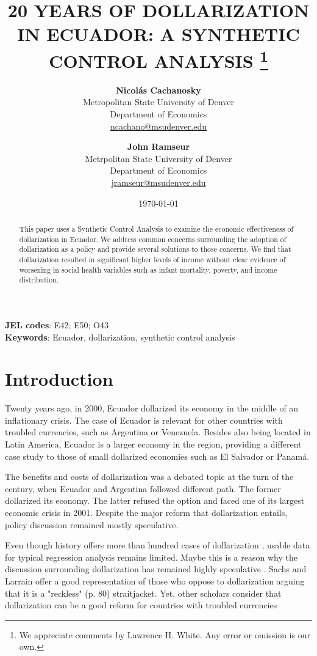 \documentclass[12pt]{article}
\title{20 YEARS OF DOLLARIZATION IN ECUADOR: A SYNTHETIC CONTROL ANALYSIS
       \thanks{We appreciate comments by Lawrence H. White. Any error or omission is our own.} \\
       \bigskip}
\author{
        \textbf{Nicolás Cachanosky} \\
        Metropolitan State University of Denver \\
        Department of Economics \\
        \href{mailto:ncachano@msudenver.edu}{ncachano@msudenver.edu} \\
        \and
        \textbf{John Ramseur} \\
        Metrpolitan State University of Denver \\
        Department of Economics \\
        \href{mailto:jramseur@msudenver.edu}{jramseur@msudenver.edu} \\
        \bigskip}
\date{\today}
\begin{document}

\maketitle

\begin{abstract}
\noindent
This paper uses a Synthetic Control Analysis to examine the economic effectiveness of dollarization in Ecuador. We address common concerns surrounding the adoption of dollarization as a policy and provide several solutions to those concerns. We find that dollarization resulted in significant higher levels of income without clear evidence of worsening in social health variables such as infant mortality, poverty, and income distribution.
\end{abstract}

\bigskip \bigskip
\footnotesize \noindent \textbf{JEL codes}: E42; E50; O43 \\
\footnotesize \noindent \textbf{Keywords}: Ecuador, dollarization, synthetic control analysis

\newpage
\doublespacing


\section{Introduction} 
    \label{sec:intro}

Twenty years ago, in 2000, Ecuador dollarized its economy in the middle of an inflationary crisis. The case of Ecuador is relevant for other countries with troubled currencies, such as Argentina or Venezuela. Besides also being located in Latin America, Ecuador is a larger economy in the region, providing a different case study to those of small dollarized economies such as El Salvador or Panamá. 

The benefits and costs of dollarization was a debated topic at the turn of the century, when Ecuador and Argentina followed different path. The former dollarized its economy. The latter refused the option and faced one of its largest economic crisis in 2001. Despite the major reform that dollarization entails, policy discussion remained mostly speculative. 

Even though history offers more than hundred cases of dollarization \parencite{Schuler2005}, usable data for typical regression analysis remains limited. Maybe this is a reason why the discussion surrounding dollarization has remained highly speculative \parencite[for a sample see][]{Levy-Yeyati2002,Salvatore2003}. Sachs and Larrain \parencite*{Sachs1999} offer a good representation of those who oppose to dollarization arguing that it is a "reckless" (p. 80) straitjacket. Yet, other scholars consider that dollarization can be a good reform for countries with troubled currencies  \parencite{Avila2018,Cochrane2018,Gale2002,Hanke2003a,White2014a} 
\end{document}
